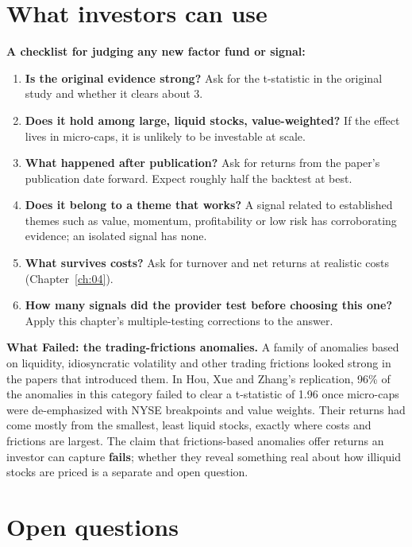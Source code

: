 \section{What investors can use}
\label{sec:07-investors}

\textbf{A checklist for judging any new factor fund or signal:}

\begin{enumerate}
  \item \textbf{Is the original evidence strong?} Ask for the t-statistic in the original study and whether it clears about 3.
  \item \textbf{Does it hold among large, liquid stocks, value-weighted?} If the effect lives in micro-caps, it is unlikely to be investable at scale.
  \item \textbf{What happened after publication?} Ask for returns from the paper's publication date forward. Expect roughly half the backtest at best.
  \item \textbf{Does it belong to a theme that works?} A signal related to established themes such as value, momentum, profitability or low risk has corroborating evidence; an isolated signal has none.
  \item \textbf{What survives costs?} Ask for turnover and net returns at realistic costs (Chapter~\ref{ch:04}).
  \item \textbf{How many signals did the provider test before choosing this one?} Apply this chapter's multiple-testing corrections to the answer.
\end{enumerate}

\begin{callout}
\textbf{What Failed: the trading-frictions anomalies.} A family of anomalies based on liquidity, idiosyncratic volatility and other trading frictions looked strong in the papers that introduced them. In Hou, Xue and Zhang's replication, 96\% of the anomalies in this category failed to clear a t-statistic of 1.96 once micro-caps were de-emphasized with NYSE breakpoints and value weights. Their returns had come mostly from the smallest, least liquid stocks, exactly where costs and frictions are largest. The claim that frictions-based anomalies offer returns an investor can capture \textbf{fails}; whether they reveal something real about how illiquid stocks are priced is a separate and open question.
\end{callout}

\section{Open questions}
\label{sec:07-open}

